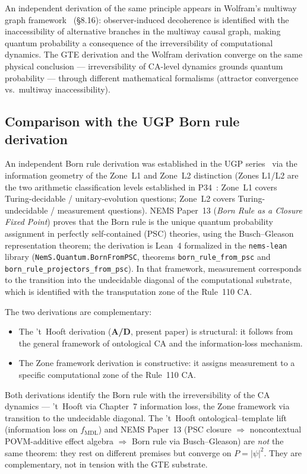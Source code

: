 \documentclass[11pt]{article}
\theoremstyle{remark}
\newcommand{\MDL}{\text{MDL}}
\newcommand{\CatAD}{\textbf{A/D}}
\begin{document}
An independent derivation of the same principle appears in Wolfram's
multiway graph framework~\cite{Wolfram2020Tech} (\S8.16):
observer-induced decoherence is identified with the inaccessibility of
alternative branches in the multiway causal graph, making quantum
probability a consequence of the irreversibility of computational
dynamics.
The GTE derivation and the Wolfram derivation converge on the same
physical conclusion --- irreversibility of CA-level dynamics grounds
quantum probability --- through different mathematical formalisms
(attractor convergence vs.\ multiway inaccessibility).

\subsection{Comparison with the UGP Born rule derivation}
\label{ssec:born_comparison}

An independent Born rule derivation was established in the UGP series~\cite{SpivackBornRule,SpivackBornOnRamp}
via the information geometry of the Zone~L1 and Zone~L2 distinction
(Zones L1/L2 are the two arithmetic classification levels established in P34~\cite{SpivackGTEMobius}: Zone~L1 covers Turing-decidable / unitary-evolution questions; Zone~L2 covers Turing-undecidable / measurement questions).
NEMS Paper~13 (\textit{Born Rule as a Closure Fixed Point}) proves that
the Born rule is the unique quantum probability assignment in perfectly
self-contained (PSC) theories, using the Busch--Gleason representation
theorem; the derivation is Lean~4 formalized in the \texttt{nems-lean}
library (\texttt{NemS.Quantum.BornFromPSC}, theorems
\texttt{born\_rule\_from\_psc} and \texttt{born\_rule\_projectors\_from\_psc}).
In that framework, measurement corresponds to the transition into the
undecidable diagonal of the computational substrate, which is
identified with the transputation zone of the Rule~110 CA.

The two derivations are complementary:
\begin{itemize}[leftmargin=2em]
\item The 't~Hooft derivation (\CatAD{}, present paper) is structural:
  it follows from the general framework of ontological CA and the
  information-loss mechanism.
\item The Zone framework derivation is constructive: it assigns measurement
  to a specific computational zone of the Rule~110 CA.
\end{itemize}
Both derivations identify the Born rule with the irreversibility of
the CA dynamics --- 't~Hooft via Chapter~7 information loss, the
Zone framework via transition to the undecidable diagonal.
The 't~Hooft ontological--template lift (information loss on $f_{\MDL}$) and
NEMS Paper~13 (PSC closure $\Rightarrow$ noncontextual POVM-additive effect algebra
$\Rightarrow$ Born rule via Busch--Gleason) are \emph{not} the same theorem: they
rest on different premises but converge on $P = |\psi|^2$.
They are complementary, not in tension with the GTE substrate.
\end{document}
